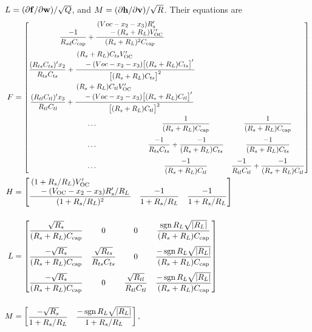 \documentclass[../zhang_thesis.tex]{subfiles}
\begin{document}
$L=(\partial\mathbf{f}/\partial\mathbf{w})/\sqrt{Q}$, and $M=(\partial\mathbf{h}/\partial\mathbf{v})/\sqrt{R}$. Their equations are
\begin{align}
    F & = \scalemath{0.9}{ \left[ \begin{multlined} \begin{array}{@{}c}
        \dfrac{-1}{R_{sd}C_\text{cap}} + \dfrac{\splitfrac{(Voc-x_2-x_3)R_s'}{- (R_s+R_L)V_\text{OC}'}}{(R_s+R_L)^2 C_\text{cap}} \\[3ex]
        \dfrac{(R_{ts}C_{ts})' x_2}{R_{ts}C_{ts}} + \dfrac{\splitfrac{(R_s+R_L)C_{ts}V_\text{OC}'}{- (Voc-x_2-x_3)\big[(R_s+R_L)C_{ts}\big]'}}{\big[(R_s+R_L)C_{ts}\big]^2}  \\[3ex]
        \dfrac{(R_{tl}C_{tl})' x_3}{R_{tl}C_{tl}} + \dfrac{\splitfrac{(R_s+R_L)C_{tl}V_\text{OC}'}{- (Voc-x_2-x_3)\big[(R_s+R_L)C_{tl}\big]'}}{\big[(R_s+R_L)C_{tl}\big]^2} 
        \end{array} \\
        \begin{array}{@{\hspace{1in}\ldots\hspace{1in}}cc@{}}
            \dfrac{1}{(R_s+R_L)C_\text{cap}} & \dfrac{1}{(R_s+R_L)C_\text{cap}} \\[3ex]
            \dfrac{-1}{R_{ts}C_{ts}}+\dfrac{-1}{(R_s+R_L)C_{ts}} & \dfrac{-1}{(R_s+R_L)C_{ts}} \\[3ex]
            \dfrac{-1}{(R_s+R_L)C_{tl}} & \dfrac{-1}{R_{tl}C_{tl}}+\dfrac{-1}{(R_s+R_L)C_{tl}}
        \end{array} \end{multlined} \right] } \\
    H & = \begin{bmatrix}
            \dfrac{\splitfrac{(1+R_s/R_L)V_\text{OC}'}{- (V_\text{OC}-x_2-x_3)R_s'/R_L}}{(1+R_s/R_L)^2} & \dfrac{-1}{1+R_s/R_L} & \dfrac{-1}{1+R_s/R_L}
        \end{bmatrix} \\[3ex]
    L & = \begin{bmatrix}
            \dfrac{\sqrt{R_s}}{(R_s+R_L)C_\text{cap}} & 0 & 0 & \dfrac{\sgn{R_L}\sqrt{|R_L|}}{(R_s+R_L)C_\text{cap}} \\[3ex]
            \dfrac{-\sqrt{R_s}}{(R_s+R_L)C_\text{cap}} & \dfrac{\sqrt{R_{ts}}}{R_{ts}C_{ts}} & 0 & \dfrac{-\sgn{R_L}\sqrt{|R_L|}}{(R_s+R_L)C_\text{cap}} \\[3ex]
            \dfrac{-\sqrt{R_s}}{(R_s+R_L)C_\text{cap}} & 0 & \dfrac{\sqrt{R_{tl}}}{R_{tl}C_{tl}} & \dfrac{-\sgn{R_L}\sqrt{|R_L|}}{(R_s+R_L)C_\text{cap}}
        \end{bmatrix} \\[3ex]
    M & = \begin{bmatrix}
            \dfrac{-\sqrt{R_s}}{1+R_s/R_L} & \dfrac{-\sgn{R_L}\sqrt{|R_L|}}{1+R_s/R_L}
        \end{bmatrix} ,
\end{align}
\end{document}
